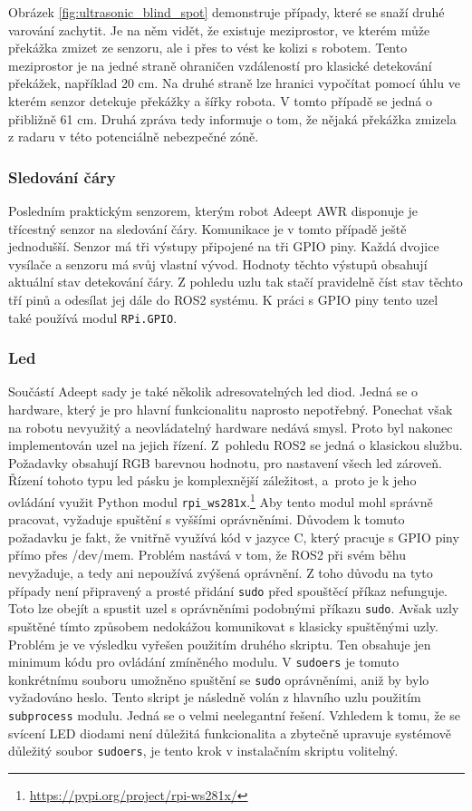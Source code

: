 Obrázek \ref{fig:ultrasonic_blind_spot} demonstruje případy, které se snaží druhé varování zachytit. Je na něm vidět, že existuje meziprostor, ve kterém může překážka zmizet ze senzoru, ale i přes to vést ke kolizi s robotem. Tento meziprostor je na jedné straně ohraničen vzdáleností pro klasické detekování překážek, například 20 cm. Na druhé straně lze hranici vypočítat pomocí úhlu ve kterém senzor detekuje překážky a šířky robota.
V tomto případě se jedná o přibližně 61 cm. Druhá zpráva tedy informuje o tom, že nějaká překážka zmizela z radaru v této potenciálně nebezpečné zóně.

\subsubsection*{Sledování čáry}
Posledním praktickým senzorem, kterým robot Adeept AWR disponuje je třícestný senzor na sledování čáry.
Komunikace je v tomto případě ještě jednodušší. Senzor má tři výstupy připojené na tři GPIO piny. Každá dvojice vysílače a senzoru má svůj vlastní vývod. Hodnoty těchto výstupů obsahují aktuální stav detekování čáry. Z pohledu uzlu tak stačí pravidelně číst stav těchto tří pinů a odesílat jej dále do ROS2 systému. K práci s GPIO piny tento uzel také používá modul \verb|RPi.GPIO|.

\subsubsection*{Led}
Součástí Adeept sady je také několik adresovatelných led diod. Jedná se o hardware, který je pro hlavní funkcionalitu naprosto nepotřebný. Ponechat však na robotu nevyužitý a neovládatelný hardware nedává smysl. Proto byl nakonec implementován uzel na jejich řízení. Z~pohledu ROS2 se jedná o klasickou službu. Požadavky obsahují RGB barevnou hodnotu, pro nastavení všech led zároveň. Řízení tohoto typu led pásku je komplexnější záležitost, a~proto je k jeho ovládání využit Python modul \verb|rpi_ws281x|.\footnote{\url{https://pypi.org/project/rpi-ws281x/}}
Aby tento modul mohl správně pracovat, vyžaduje spuštění s vyššími oprávněními. Důvodem k tomuto požadavku je fakt, že vnitřně využívá kód v jazyce C, který pracuje s GPIO piny přímo přes /dev/mem. Problém nastává v tom, že ROS2 při svém běhu nevyžaduje, a tedy ani nepoužívá zvýšená oprávnění. Z toho důvodu na tyto případy není připravený a prosté přidání \verb|sudo| před spouštěcí příkaz nefunguje. Toto lze obejít a spustit uzel s oprávněními podobnými příkazu \verb|sudo|. Avšak uzly spuštěné tímto způsobem nedokážou komunikovat s klasicky spuštěnými uzly. 
Problém je ve výsledku vyřešen použitím druhého skriptu. Ten obsahuje jen minimum kódu pro ovládání zmíněného modulu. V \verb|sudoers| je tomuto konkrétnímu souboru umožněno spuštění se \verb|sudo| oprávněními, aniž by bylo vyžadováno heslo. Tento skript je následně volán z hlavního uzlu použitím \verb|subprocess| modulu. Jedná se o velmi neelegantní řešení. Vzhledem k tomu, že se svícení LED diodami není důležitá funkcionalita a zbytečně upravuje systémově důležitý soubor \verb|sudoers|, je tento krok v instalačním skriptu volitelný.

